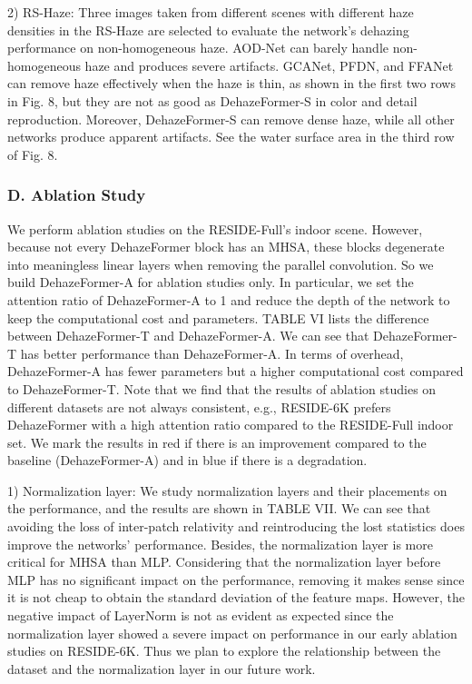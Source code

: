 2) RS-Haze: Three images taken from different scenes with different haze densities in the RS-Haze are selected to evaluate the network’s dehazing performance on non-homogeneous haze. AOD-Net can barely handle non-homogeneous haze and produces severe artifacts. GCANet, PFDN, and FFANet can remove haze effectively when the haze is thin, as shown in the first two rows in Fig. 8, but they are not as good as DehazeFormer-S in color and detail reproduction. Moreover, DehazeFormer-S can remove dense haze, while all other networks produce apparent artifacts. See the water surface area in the third row of Fig. 8.

\subsubsection{D. Ablation Study}

We perform ablation studies on the RESIDE-Full’s indoor scene. However, because not every DehazeFormer block has an MHSA, these blocks degenerate into meaningless linear layers when removing the parallel convolution. So we build DehazeFormer-A for ablation studies only. In particular, we set the attention ratio of DehazeFormer-A to 1 and reduce the depth of the network to keep the computational cost and parameters. TABLE VI lists the difference between DehazeFormer-T and DehazeFormer-A. We can see that DehazeFormer-T has better performance than DehazeFormer-A. In terms of overhead, DehazeFormer-A has fewer parameters but a higher computational cost compared to DehazeFormer-T. Note that we find that the results of ablation studies on different datasets are not always consistent, e.g., RESIDE-6K prefers DehazeFormer with a high attention ratio compared to the RESIDE-Full indoor set. We mark the results in red if there is an improvement compared to the baseline (DehazeFormer-A) and in blue if there is a degradation.

1) Normalization layer: We study normalization layers and their placements on the performance, and the results are shown in TABLE VII. We can see that avoiding the loss of inter-patch relativity and reintroducing the lost statistics does improve the networks’ performance. Besides, the normalization layer is more critical for MHSA than MLP. Considering that the normalization layer before MLP has no significant impact on the performance, removing it makes sense since it is not cheap to obtain the standard deviation of the feature maps. However, the negative impact of LayerNorm is not as evident as expected since the normalization layer showed a severe impact on performance in our early ablation studies on RESIDE-6K. Thus we plan to explore the relationship between the dataset and the normalization layer in our future work.

